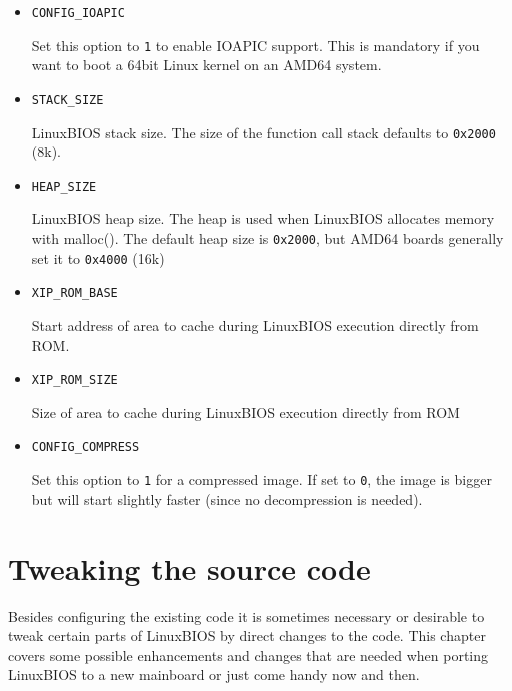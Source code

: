 \documentclass[titlepage,12pt]{article}
\begin{document}
\begin{itemize}
\item \begin{verbatim}CONFIG_IOAPIC\end{verbatim}

Set this option to \texttt{1} to enable IOAPIC support. This is
mandatory if you want to boot a 64bit Linux kernel on an AMD64 system.

\item \begin{verbatim}STACK_SIZE\end{verbatim}

LinuxBIOS stack size. The size of the function call stack defaults to
\texttt{0x2000} (8k).

\item \begin{verbatim}HEAP_SIZE\end{verbatim}

LinuxBIOS heap size. The heap is used when LinuxBIOS allocates memory
with malloc(). The default heap size is \texttt{0x2000}, but AMD64 boards
generally set it to \texttt{0x4000} (16k)

\item \begin{verbatim}XIP_ROM_BASE\end{verbatim}

Start address of area to cache during LinuxBIOS execution directly from
ROM.

\item \begin{verbatim}XIP_ROM_SIZE\end{verbatim}

Size of area to cache during LinuxBIOS execution directly from ROM

\item \begin{verbatim}CONFIG_COMPRESS\end{verbatim}

Set this option to \texttt{1} for a compressed image. If set to
\texttt{0}, the image is bigger but will start slightly faster (since no
decompression is needed).

\end{itemize}


\newpage

%
% 

\section{Tweaking the source code}
Besides configuring the existing code it is sometimes necessary or
desirable to tweak certain parts of LinuxBIOS by direct changes to the
code. This chapter covers some possible enhancements and changes that
are needed when porting LinuxBIOS to a new mainboard or just come
handy now and then.
\end{document}
